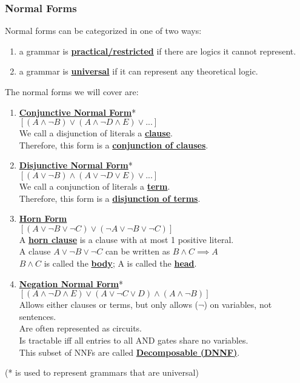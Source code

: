 \documentclass[../../lecture_notes.tex]{subfiles}
\begin{document}
\subsubsection*{Normal Forms}
\noindent Normal forms can be categorized in one of two ways:
\begin{enumerate} [itemsep=0mm]
	\item a grammar is \textbf{\underline{practical/restricted}} if there are logics it cannot represent.
	\item a grammar is \textbf{\underline{universal}} if it can represent any theoretical logic.
\end{enumerate}
The normal forms we will cover are:
\begin{enumerate} [itemsep=0mm]
	\item \textbf{\underline{Conjunctive Normal Form}}* \\
		$[(A \land \neg B) \lor (A \land \neg D \land E) \lor ...]$\\
	        We call a disjunction of literals a \textbf{\underline{clause}}.\\
		Therefore, this form is a \textbf{\underline{conjunction of clauses}}.
	\item \textbf{\underline{Disjunctive Normal Form}}* \\
		$[(A \lor \neg B) \land (A \lor \neg D \lor E) \lor ...]$\\
		We call a conjunction of literals a \textbf{\underline{term}}.\\
		Therefore, this form is a \textbf{\underline{disjunction of terms}}.
	\item \textbf{\underline{Horn Form}} \\
		$[(A \lor \neg B \lor \neg C) \lor (\neg A \lor \neg B \lor \neg C)]$\\
		A \textbf{\underline{horn clause}} is a clause with at most 1 positive literal.\\
		A clause $A \lor \neg B \lor \neg C$ can be written as $B \land C \implies A$\\
		$B \land C$ is called the \textbf{\underline{body}}; A is called the \textbf{\underline{head}}.
	\item \textbf{\underline{Negation Normal Form}}* \\
		$[(A \land \neg D \land E) \lor (A \lor \neg C \lor D) \land (A \land \neg B)]$\\
		Allows either clauses or terms, but only allows ($\neg$) on variables, not sentences.\\
		Are often represented as circuits.\\
		Is tractable iff all entries to all AND gates share no variables.\\
		This subset of NNFs are called \textbf{\underline{Decomposable (DNNF)}}.
\end{enumerate}  (* is used to represent grammars that are universal)\\
\end{document}
